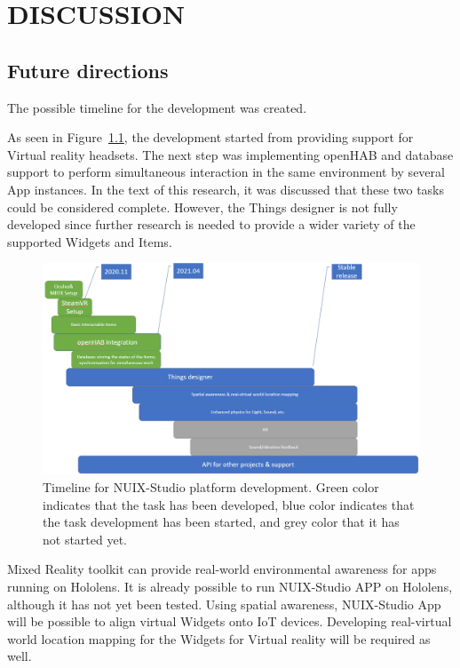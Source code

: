 
\chapter{DISCUSSION}

\section{Future directions}

The possible timeline for the development was created.

As seen in Figure~\ref{fig:Timeline-figure}, the development started from providing support for Virtual reality headsets. The next step was implementing openHAB and database support to perform simultaneous interaction in the same environment by several App instances. In the text of this research, it was discussed that these two tasks could be considered complete. However, the Things designer is not fully developed since further research is needed to provide a wider variety of the supported Widgets and Items.

\begin{figure}
  \centering
  \includegraphics[width=0.9\linewidth]{figures/Timeline.png}
  \caption{Timeline for NUIX-Studio platform development. Green color indicates that the task has been developed, blue color indicates that the task development has been started, and grey color that it has not started yet.}
  \label{fig:Timeline-figure}
\end{figure}

Mixed Reality toolkit can provide real-world environmental awareness for apps running on Hololens. It is already possible to run NUIX-Studio APP on Hololens, although it has not yet been tested. Using spatial awareness, NUIX-Studio App will be possible to align virtual Widgets onto IoT devices. Developing real-virtual world location mapping for the Widgets for Virtual reality will be required as well.

